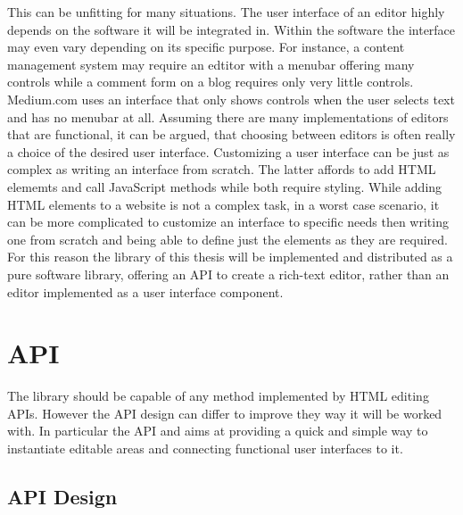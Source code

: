 This can be unfitting for many situations. The user interface of an editor highly depends on the software it will be integrated in. Within the software the interface may even vary depending on its specific purpose. For instance, a content management system may require an edtitor with a menubar offering many controls while a comment form on a blog requires only very little controls. Medium.com uses an interface that only shows controls when the user selects text and has no menubar at all. Assuming there are many implementations of editors that are functional, it can be argued, that choosing between editors is often really a choice of the desired user interface. Customizing a user interface can be just as complex as writing an interface from scratch. The latter affords to add HTML elememts and call JavaScript methods while both require styling. While adding HTML elements to a website is not a complex task, in a worst case scenario, it can be more complicated to customize an interface to specific needs then writing one from scratch and being able to define just the elements as they are required. For this reason the library of this thesis will be implemented and distributed as a pure software library, offering an API to create a rich-text editor, rather than an editor implemented as a user interface component.



\section{API}
\label{sec:api_design}
\label{sec:las_before_software_architecture}


The library should be capable of any method implemented by HTML editing APIs. However the API design can differ to improve they way it will be worked with. In particular the API and aims at providing a quick and simple way to instantiate editable areas and connecting functional user interfaces to it.

\subsection{API Design}

